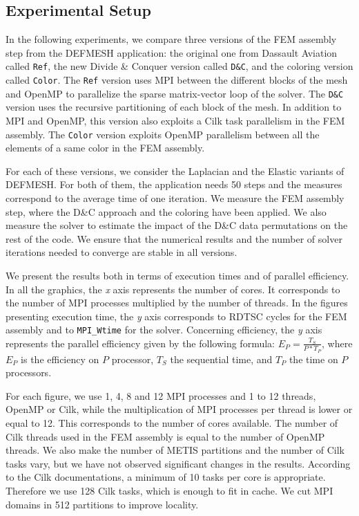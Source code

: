 \documentclass[10pt]{IOS-Book-Article}
\begin{document}
\subsection{Experimental Setup}
In the following experiments, we compare three versions of the FEM assembly step from the DEFMESH application:
the original one from Dassault Aviation called {\tt Ref}, the new Divide \& Conquer version called {\tt D\&C}, and the coloring version called {\tt Color}.
The {\tt Ref} version uses MPI between the different blocks of the mesh and OpenMP to parallelize the sparse matrix-vector loop of the solver.
The {\tt D\&C} version uses the recursive partitioning of each block of the mesh.
In addition to MPI and OpenMP, this version also exploits a Cilk task parallelism in the FEM assembly.
The {\tt Color} version exploits OpenMP parallelism between all the elements of a same color in the FEM assembly.

For each of these versions, we consider the Laplacian and the Elastic variants of DEFMESH.
For both of them, the application needs 50 steps and the measures correspond to the average time of one iteration.
We measure the FEM assembly step, where the D\&C approach and the coloring have been applied.
We also measure the solver to estimate the impact of the D\&C data permutations on the rest of the code.
We ensure that the numerical results and the number of solver iterations needed to converge are stable in all versions.

We present the results both in terms of execution times and of parallel efficiency.
In all the graphics, the \emph{x} axis represents the number of cores. It corresponds to the number of MPI processes multiplied by the number of threads.
In the figures presenting execution time, the \emph{y} axis corresponds to RDTSC cycles for the FEM assembly and to \texttt{MPI\_Wtime} for the solver.
Concerning efficiency, the \emph{y} axis represents the parallel efficiency given by the following formula:
$E_{P} = \frac{T_{S}}{P*T_{P}}$, where $E_{P}$ is the efficiency on $P$ processor, $T_{S}$ the sequential time, and $T_{P}$ the time on $P$ processors.

For each figure, we use 1, 4, 8 and 12 MPI processes and 1 to 12 threads, OpenMP or Cilk, while the multiplication of MPI processes per thread is lower or equal to 12.
This corresponds to the number of cores available. The number of Cilk threads used in the FEM assembly is equal to the number of OpenMP threads.
We also make the number of METIS partitions and the number of Cilk tasks vary, but we have not observed significant changes in the results.
According to the Cilk documentations, a minimum of 10 tasks per core is appropriate. Therefore we use 128 Cilk tasks, which is enough to fit in cache.
We cut MPI domains in 512 partitions to improve locality.
\end{document}
